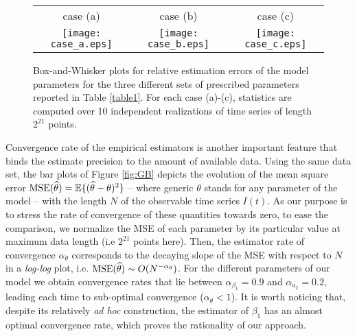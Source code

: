 \documentclass[twoside]{article}
\newcommand{\paulo}[2]{#2}
\begin{document}
\begin{figure}[h]
\centering
\hspace*{-5mm}\begin{tabular}{ccc}
\hspace*{5mm}case (a) & \hspace*{5mm}case (b) & \hspace*{5mm}case (c)\\[-1mm]
\texttt{[image: case\_a.eps]} &
\texttt{[image: case\_b.eps]} &
\hspace*{3mm}\texttt{[image: case\_c.eps]} 
\end{tabular}
\caption{\small Box-and-Whisker plots for relative estimation errors of the model parameters for the three different sets of prescribed parameters reported in Table \ref{table1}. For each case (a)-(c), statistics are computed over 10 independent realizations of time series of length  $2^{21}$ points.}
\label{fig:box-plot}
\end{figure}
\paulo{
We also check how the accuracy of our estimation procedure varies with the number of samples for one case (case (b)). We consider $\beta_1$, $\gamma$ and $\mu$ to show the convergence. Figure \ref{fig:GV} shows the relative error of estimation against the number of samples. As a general comment we infer that relative error in the estimation procedure of $\beta_1$, $\gamma$ and $\mu$ decreases with the increase in trace length, i.e. the number of points in the samples. In our estimation procedure the rates of convergence are $0.64, 0.82$ and $0.067$ for $\beta_1, \gamma$ and $\mu$ respectively. We observe that $\beta_1$ and $\gamma$ converge rapidly with increased trace length. However, for $\mu$ the estimation error varies very little over the number of points.
}
{
Convergence rate of the empirical estimators is another important feature that binds the estimate precision to the amount of available data. Using the same data set, the bar plots of Figure \ref{fig:GB} depicts the evolution of the mean square error ${\rm MSE}(\widehat{\theta})=\mathbb{E}\{(\widehat{\theta} - \theta)^2\}$ -- where generic $\theta$ stands for any parameter of the model -- with the length $N$ of the observable time series $I(t)$. As our purpose  is to stress the rate of convergence of these quantities towards zero, to ease the comparison, we normalize the MSE of each parameter by its particular value at maximum data length (i.e $2^{21}$ points here). Then, the estimator rate of convergence $\alpha_{\theta}$ corresponds to the decaying slope of the MSE with respect to $N$ in a {\em log-log} plot, i.e. ${\rm MSE}(\widehat{\theta}) \sim O(N^{-\alpha_{\theta}})$. For the different parameters of our model we obtain convergence rates that lie between $\alpha_{\beta_1}=0.9$ and $\alpha_{a_2}=0.2$, leading each time to sub-optimal convergence ($\alpha_{\theta}  < 1$). It is worth noticing that, despite its relatively {\em ad hoc} construction, the estimator of  $\beta_1$ has an almost optimal convergence rate, which proves the rationality of our approach. 
}
\end{document}
